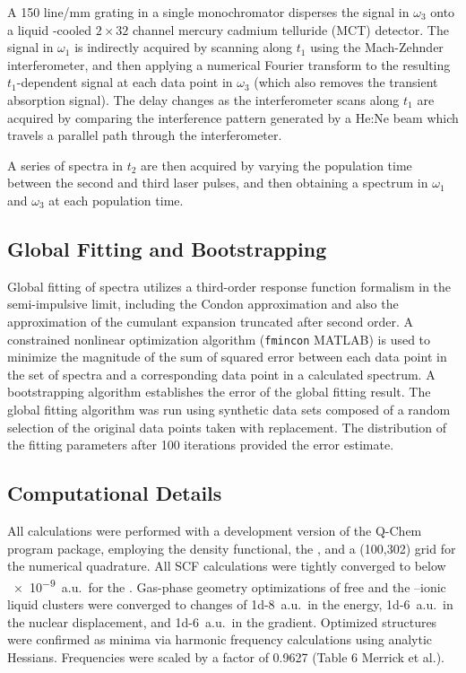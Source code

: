\documentclass[%
  class = book,%
  crop = false,%
  float = true,%
  multi = true,%
  preview = false,%
]{standalone}
\let\cite\autocite
\begin{document}
{A 150 line/mm grating in a single monochromator disperses the signal in \(\omega_3\) onto a liquid -cooled \(2 \times 32\) channel mercury cadmium telluride (MCT) detector. The signal in \(\omega_1\) is indirectly acquired by scanning along \(t_1\) using the Mach-Zehnder interferometer, and then applying a numerical Fourier transform to the resulting \(t_1\)-dependent signal at each data point in \(\omega_3\) (which also removes the transient absorption signal). The delay changes as the interferometer scans along \(t_1\) are acquired by comparing the interference pattern generated by a He:Ne beam which travels a parallel path through the interferometer.

A series of spectra in \(t_2\) are then acquired by varying the population time between the second and third laser pulses, and then obtaining a spectrum in \(\omega_1\) and \(\omega_3\) at each population time.

\subsection{Global Fitting and Bootstrapping}
\label{sec:anions_methods_fitting}

Global fitting of spectra utilizes a third-order response function formalism in the semi-impulsive limit, including the Condon approximation and also the approximation of the cumulant expansion truncated after second order. A constrained nonlinear optimization algorithm (\verb!fmincon! MATLAB) is used to minimize the magnitude of the sum of squared error between each data point in the set of spectra and a corresponding data point in a calculated spectrum. A bootstrapping algorithm \cite{numericalrecipes-92} establishes the error of the global fitting result. The global fitting algorithm was run using synthetic data sets composed of a random selection of the original data points taken with replacement. The distribution of the fitting parameters after 100 iterations provided the error estimate.

\subsection{Computational Details}
\label{sec:anions_methods_computational}

All calculations were performed with a development version of the Q-Chem program package\cite{Shao2015}, employing the   density functional, the   , and a (100,302) grid for the numerical quadrature. All SCF calculations were tightly converged to below \num{e-9}~a.u.\ for the  . Gas-phase geometry optimizations of free  and the --ionic liquid clusters were converged to changes of \num{1d-8}~a.u.\ in the energy, \num{1d-6}~a.u.\ in the nuclear displacement, and \num{1d-6}~a.u.\ in the gradient. Optimized structures were confirmed as minima via harmonic frequency calculations using analytic Hessians. Frequencies were scaled by a factor of \num{0.9627} (Table 6 Merrick et al.)\cite{Merrick2007}.

}
\end{document}
